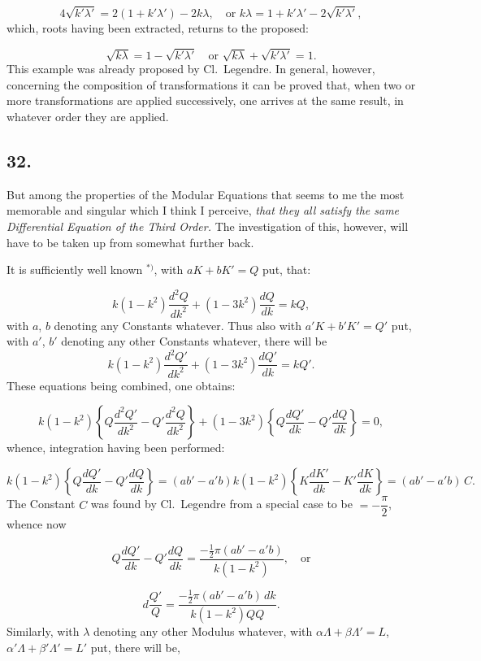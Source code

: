 \documentclass{article}
\begin{document}
\[
4\sqrt{k'\lambda'}=2(1+k'\lambda')-2k\lambda,\quad\text{or }k\lambda=1+k'\lambda'-2\sqrt{k'\lambda'},
\]
which, roots having been extracted, returns to the proposed:

\[
\sqrt{k\lambda}=1-\sqrt{k'\lambda'}\quad\text{or }\sqrt{k\lambda}+\sqrt{k'\lambda'}=1.
\]
This example was already proposed by Cl.\ Legendre. In general, however, concerning the composition of transformations it can be proved that, when two or more transformations are applied successively, one arrives at the same result, in whatever order they are applied.


\subsection*{32.}

But among the properties of the Modular Equations that seems to me the most memorable and singular which I think I perceive, \emph{that they all satisfy the same Differential Equation of the Third Order.} The investigation of this, however, will have to be taken up from somewhat further back.

It is sufficiently well known ${}^{*)}$, with $aK+bK'=Q$ put, that:

\[
k(1-k^{2})\frac{d^{2}Q}{dk^{2}}+(1-3k^{2})\frac{dQ}{dk}=kQ,
\]
with $a$, $b$ denoting any Constants whatever. Thus also with $a'K+b'K'=Q'$ put, with $a'$, $b'$ denoting any other Constants whatever, there will be
\[
k(1-k^{2})\frac{d^{2}Q'}{dk^{2}}+(1-3k^{2})\frac{dQ'}{dk}=kQ'.
\]
These equations being combined, one obtains:

\[
k(1-k^{2})\left\{Q\frac{d^{2}Q'}{dk^{2}}-Q'\frac{d^{2}Q}{dk^{2}}\right\}+(1-3k^{2})\left\{Q\frac{dQ'}{dk}-Q'\frac{dQ}{dk}\right\}=0,
\]
whence, integration having been performed:

\[
k(1-k^{2})\left\{Q\frac{dQ'}{dk}-Q'\frac{dQ}{dk}\right\}=(ab'-a'b)k(1-k^{2})\left\{K\frac{dK'}{dk}-K'\frac{dK}{dk}\right\}=(ab'-a'b)\,C.
\]
The Constant $C$ was found by Cl.\ Legendre from a special case to be $=-\dfrac{\pi}{2}$, whence now

\[
Q\frac{dQ'}{dk}-Q'\frac{dQ}{dk}=\frac{-\frac{1}{2}\pi(ab'-a'b)}{k(1-k^{2})},\quad\text{or}
\]

\[
d\frac{Q'}{Q}=\frac{-\frac{1}{2}\pi(ab'-a'b)\,dk}{k(1-k^{2})QQ}.
\]
Similarly, with $\lambda$ denoting any other Modulus whatever, with $\alpha\Lambda+\beta\Lambda'=L$, $\alpha'\Lambda+\beta'\Lambda'=L'$ put, there will be,
\end{document}
